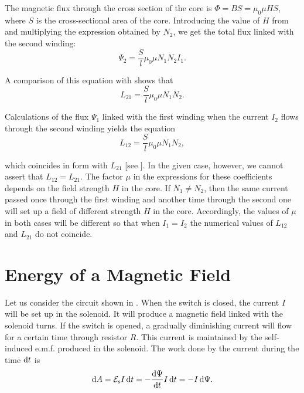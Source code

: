 The magnetic flux through the cross section of the core is $\Phi=BS=\mu_0\mu HS$, where $S$ is the cross-sectional area of the core.
Introducing the value of $H$ from  and multiplying the expression obtained by $N_2$, we get the total flux linked with the second winding:
\begin{equation*}
	\Psi_2 = \frac{S}{l} \mu_0 \mu N_1 N_2 I_1.
\end{equation*}

\noindent
A comparison of this equation with  shows that
\begin{equation}\label{eq:8_32}
	L_{21} = \frac{S}{l} \mu_0 \mu N_1 N_2.
\end{equation}

Calculations of the flux $\Psi_1$ linked with the first winding when the current $I_2$ flows through the second winding yields the equation
\begin{equation}\label{eq:8_33}
	L_{12} = \frac{S}{l} \mu_0 \mu N_1 N_2,
\end{equation}

\noindent
which coincides in form with $L_{21}$ [see ].
In the given case, however, we cannot assert that $L_{12}=L_{21}$. The factor $\mu$ in the expressions for these coefficients depends on the field strength $H$ in the core.
If $N_1\neq N_2$, then the same current passed once through the first winding and another time through the second one will set up a field of different strength $H$ in the core.
Accordingly, the values of $\mu$ in both cases will be different so that when $I_1=I_2$ the numerical values of $L_{12}$ and $L_{21}$ do not coincide.

\section{Energy of a Magnetic Field}\label{sec:8_8}

Let us consider the circuit shown in .
When the switch is closed, the current $I$ will be set up in the solenoid.
It will produce a magnetic field linked with the solenoid turns.
If the switch is opened, a gradually diminishing current will flow for a certain time through resistor $R$.
This current is maintained by the self-induced e.m.f. produced in the solenoid.
The work done by the current during the time $\mathrm{d} t$ is
\begin{equation}\label{eq:8_34}
	\mathrm{d} A = \mathcal{E}_{\text{s}} I\, \mathrm{d} t = -\dfrac{\mathrm{d}\Psi}{\mathrm{d} t} I\, \mathrm{d} t = -I\, \mathrm{d}\Psi.
\end{equation}


